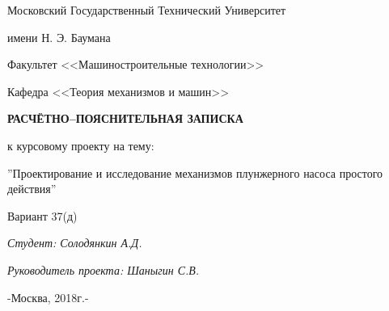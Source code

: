 \documentclass[a4paper]{article}
\begin{document}
	\pagestyle{empty}
	\begin{center}
		Московский Государственный Технический Университет
		
		имени Н. Э. Баумана
	\end{center}
	\underline{\hspace{0.9\textwidth}}
	\vfill
	\vfill
	\begin{center}
		Факультет <<Машиностроительные технологии>>
		
		Кафедра <<Теория механизмов и машин>>
	\end{center}
	\vfill
	\vfill
	\vfill
	\begin{center}
		\large
		\textbf{РАСЧЁТНО--ПОЯСНИТЕЛЬНАЯ ЗАПИСКА}
	\end{center}
	
	\begin{center}
		к курсовому проекту на тему:
	\end{center}
	\begin{center}
		\large
		''Проектирование и исследование механизмов плунжерного насоса простого действия''
	\end{center}
	
	\begin{center}
		Вариант 37(д)
	\end{center}
	\vfill
	\vfill
	\textit{Студент: Солодянкин А.Д.}
	
	\noindent\textit{Руководитель проекта: Шаныгин С.В.}
	
	\underline{\hspace{0.9\textwidth}}
	
	\begin{center}
		-Москва, 2018г.-
	\end{center}
	\clearpage
	\pagestyle{fancy} %
	\fancyhf{} %
	\fancyhead[R]{\normalsize \thepage} %
	\renewcommand{\headrulewidth}{0pt} %
	
	\newpage
	\tableofcontents
	\newpage
	
	\newpage
	
	\newpage
	
	\newpage
	
	\newpage
	
	\newpage
	
	\newpage
	
	\newpage
	
	\newpage
	
\end{document}
